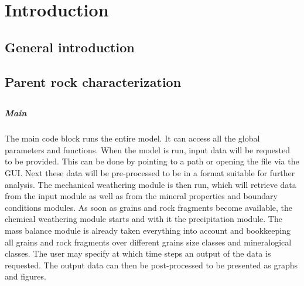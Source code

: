 \chapter{Introduction}\label{ch:introduction}

\instructionsintroduction



    \section{General introduction}
    \section{Parent rock characterization}
    \section{}

\paragraph{Main}
The main code block runs the entire model. %
It can access all the global parameters and functions. %
When the model is run, input data will be requested to be provided. %
This can be done by pointing to a path or opening the file via the GUI. %
Next these data will be pre-processed to be in a format suitable for further analysis. %
The mechanical weathering module is then run, which will retrieve data from the input module as well as from the mineral properties and boundary conditions modules. %
As soon as grains and rock fragments become available, the chemical weathering module starts and with it the precipitation module. %
The mass balance module is already taken everything into account and bookkeeping all grains and rock fragments over different grains size classes and mineralogical classes. %
The user may specify at which time steps an output of the data is requested. %
The output data can then be post-processed to be presented as graphs and figures. %

